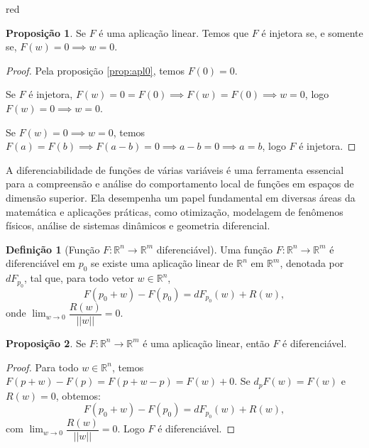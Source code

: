 \documentclass[12pt,leqno,twoside]{amsart}
\theoremstyle{definition}
\newtheorem{proposicao}{Proposição}[section]
\newtheorem{definicao}{Definição}[section]
\begin{document}
\begin{color}{red}
\vspace{0.3cm}

\begin{proposicao}
	\label{prop:aplinj}
	Se $F$ é uma aplicação linear. Temos que $F$ é injetora se, e somente se,   $F(w) = 0 \implies w=0$.
\end{proposicao}
\begin{proof}
	Pela proposição \ref{prop:apl0}, temos $F(0) = 0$.

	Se $F$ é injetora, $F(w) = 0 = F(0) \implies F(w) = F(0) \implies w = 0$, logo $F(w) = 0 \implies w = 0$.

	Se $F(w) = 0 \implies w = 0$, temos $F(a) = F(b) \implies F(a-b) = 0 \implies a-b=0 \implies a = b$, logo $F$ é injetora.
\end{proof}

\vspace{0.3cm}

A diferenciabilidade de funções de várias variáveis é uma ferramenta essencial para a compreensão e análise do comportamento local de funções em espaços de dimensão superior. Ela desempenha um papel fundamental em diversas áreas da matemática e aplicações práticas, como otimização, modelagem de fenômenos físicos, análise de sistemas dinâmicos e geometria diferencial.

\vspace{0.3cm}

\begin{definicao}[Função $F:\mathbb{R}^n \to \mathbb{R}^m$ diferenciável]
	Uma função $F:\mathbb{R}^n \to \mathbb{R}^m$ é diferenciável em $p_0$ se existe uma aplicação linear de $\mathbb{R}^n$ em $\mathbb{R}^m$, denotada por $dF_{p_0}$, tal que, para todo vetor $w \in \mathbb{R}^n$, $$F(p_0+w)-F(p_0) = dF_{p_0}(w)+R(w),$$ onde $\displaystyle\lim_{w\to 0} \dfrac{R(w)}{||w||} = 0$.
\end{definicao}

\vspace{0.3cm}


\begin{proposicao}
	\label{prop:apln}
	Se $F:\mathbb{R}^n \to \mathbb{R}^m$ é uma aplicação linear, então $F$ é diferenciável.
\end{proposicao}
\begin{proof}
	Para todo $w\in \mathbb{R}^n$, temos $F(p+w)-F(p) = F(p+w-p) = F(w) + 0 $. Se $d_p F(w) = F(w)$ e $R(w) = 0 $, obtemos:$$F(p_0+w)-F(p_0) = dF_{p_0}(w)+R(w),$$ com $\displaystyle\lim_{w\to 0} \dfrac{R(w)}{||w||} = 0$. Logo $F$ é diferenciável.


\end{proof}
\end{color}
\end{document}
